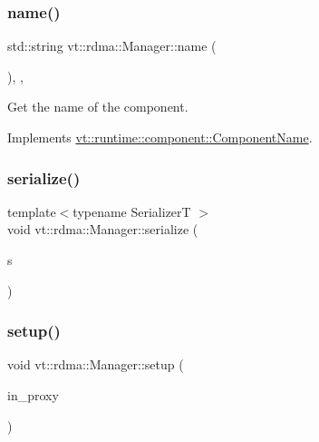 \subsubsection{\texorpdfstring{name()}{name()}}
{\footnotesize\ttfamily std\+::string vt\+::rdma\+::\+Manager\+::name (\begin{DoxyParamCaption}{ }\end{DoxyParamCaption})\hspace{0.3cm}{\ttfamily [inline]}, {\ttfamily [override]}, {\ttfamily [virtual]}}



Get the name of the component. 



Implements \hyperlink{structvt_1_1runtime_1_1component_1_1_component_name_a33c06229bb605a2b2ceff68830d6d773}{vt\+::runtime\+::component\+::\+Component\+Name}.

\mbox{\label{structvt_1_1rdma_1_1_manager_a72546bf67b9df25c54bfca2106872ea3}} 
\subsubsection{\texorpdfstring{serialize()}{serialize()}}
{\footnotesize\ttfamily template$<$typename SerializerT $>$ \\
void vt\+::rdma\+::\+Manager\+::serialize (\begin{DoxyParamCaption}\item[{SerializerT \&}]{s }\end{DoxyParamCaption})\hspace{0.3cm}{\ttfamily [inline]}}

\mbox{\label{structvt_1_1rdma_1_1_manager_a15ba4b8e5b58df7f050fc1cdaf5f2bcd}} 
\subsubsection{\texorpdfstring{setup()}{setup()}}
{\footnotesize\ttfamily void vt\+::rdma\+::\+Manager\+::setup (\begin{DoxyParamCaption}\item[{\hyperlink{structvt_1_1rdma_1_1_manager_a75d5cdc6428ea19f5ec665b04dcd7166}{Proxy\+Type}}]{in\+\_\+proxy }\end{DoxyParamCaption})\hspace{0.3cm}{\ttfamily [private]}}



